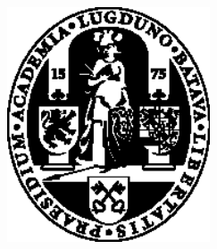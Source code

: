 %




\begin{titlepage}
	\tgherosfont
	\centering

	{\Large \thesisUniversity} \\[4mm]
	\includegraphics[width=6cm]{figs/ullogo} \\[2mm]
	\textsf{\thesisUniversityDepartment} \\
	\textsf{\thesisUniversityInstitute} \\
	\textsf{\thesisUniversityGroup} \\

	\vfill
	{\large \thesisSubject} \\[5mm]
	{\LARGE \color{ctcolortitle}\textbf{\thesisTitle} \\[10mm]}
	{\Large \thesisName} \\


\end{titlepage}
